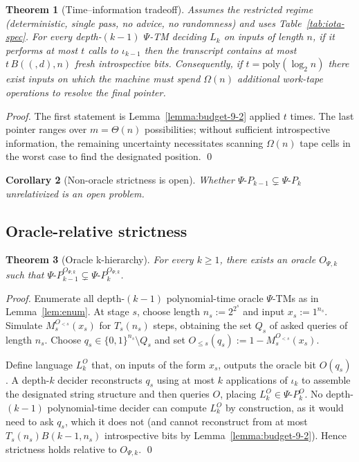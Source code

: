 \documentclass[11pt]{article}
\let\oldlog\log
\renewcommand{\log}{\oldlog_2}
\newtheorem{theorem}{Theorem}[section]
\newtheorem{corollary}[theorem]{Corollary}
\theoremstyle{plain}
\theoremstyle{definition}
\newcommand{\PSi}{\ensuremath{\Psi}}
\newcommand{\bits}{\{0,1\}}
\newcommand{\B}[2]{B(#1,#2)}  %
\begin{document}
\begin{theorem}[Time--information tradeoff]
\label{thm:tradeoff}
Assumes the restricted regime (deterministic, single pass, no advice, no randomness) and uses Table~\ref{tab:iota-spec}.
For every depth-$(k{-}1)$ $\Psi$-TM deciding $L_k$ on inputs of length $n$, if it performs at most $t$ calls to $\iota_{k-1}$ then the transcript contains at most $t\,\B(d,n)$ fresh introspective bits. Consequently, if $t=\mathrm{poly}(\log n)$ there exist inputs on which the machine must spend $\Omega(n)$ additional work-tape operations to resolve the final pointer.
\end{theorem}
\begin{proof}
The first statement is Lemma~\ref{lemma:budget-9-2} applied $t$ times. The last pointer ranges over $m=\Theta(n)$ possibilities; without sufficient introspective information, the remaining uncertainty necessitates scanning $\Omega(n)$ tape cells in the worst case to find the designated position. \qed
\end{proof}

\begin{corollary}[Non-oracle strictness is open]
\label{cor:strictness-open}
Whether $\Psi\text{-}P_{k-1}\subsetneq \Psi\text{-}P_k$ unrelativized is an open problem.
\end{corollary}

\subsection{Oracle-relative strictness}
\label{sec:oracle-strictness}

\begin{theorem}[Oracle k-hierarchy]
\label{thm:oracle-k-hierarchy}
For every $k\ge1$, there exists an oracle $O_{\PSi,k}$ such that $\Psi\text{-}P_{k-1}^{O_{\PSi,k}} \subsetneq \Psi\text{-}P_{k}^{O_{\PSi,k}}$.
\end{theorem}
\begin{proof}
Enumerate all depth-$(k{-}1)$ polynomial-time oracle \PSi-TMs as in Lemma~\ref{lem:enum}. At stage $s$, choose length $n_s:=2^{2^s}$ and input $x_s:=1^{n_s}$. Simulate $M_s^{O_{<s}}(x_s)$ for $T_s(n_s)$ steps, obtaining the set $Q_s$ of asked queries of length $n_s$. Choose $q_s\in\bits^{n_s}\setminus Q_s$ and set $O_{\le s}(q_s):=1-M_s^{O_{<s}}(x_s)$.

Define language $L_k^{O}$ that, on inputs of the form $x_s$, outputs the oracle bit $O(q_s)$. A depth-$k$ decider reconstructs $q_s$ using at most $k$ applications of $\iota_k$ to assemble the designated string structure and then queries $O$, placing $L_k^{O}\in\Psi\text{-}P_{k}^{O}$. No depth-$(k{-}1)$ polynomial-time decider can compute $L_k^{O}$ by construction, as it would need to ask $q_s$, which it does not (and cannot reconstruct from at most $T_s(n_s) B(k{-}1,n_s)$ introspective bits by Lemma~\ref{lemma:budget-9-2}). Hence strictness holds relative to $O_{\PSi,k}$. \qed
\end{proof}
\end{document}
